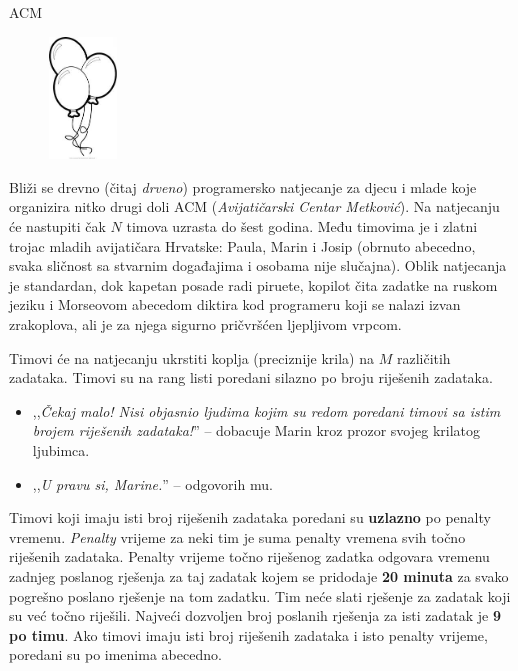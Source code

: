 \begin{statement}[
  problempoints=50,
  timelimit=1 sekunda,
  memorylimit=512 MiB,
]{ACM}

\setlength\intextsep{-0.1cm}
\begin{figure}
\centering
\includegraphics[width=0.16\textwidth]{img/balloon.jpeg}
\end{figure}

Bliži se drevno (čitaj \textit{drveno}) programersko natjecanje za djecu i
mlade koje organizira nitko drugi doli ACM (\textit{Avijatičarski Centar Metković}).
Na natjecanju će nastupiti čak $N$ timova uzrasta do šest godina. Među timovima
je i zlatni trojac mladih avijatičara Hrvatske: Paula, Marin i Josip (obrnuto
abecedno, svaka sličnost sa stvarnim događajima i osobama nije slučajna).
Oblik natjecanja je standardan, dok kapetan posade radi piruete, kopilot čita
zadatke na ruskom jeziku i Morseovom abecedom diktira kod programeru koji se
nalazi izvan zrakoplova, ali je za njega sigurno pričvršćen ljepljivom vrpcom.

Timovi će na natjecanju ukrstiti koplja (preciznije krila) na $M$ različitih
zadataka. Timovi su na rang listi poredani silazno po broju riješenih
zadataka.

\begin{itemize}[topsep=0pt]
\item ,,\textit{Čekaj malo! Nisi objasnio ljudima kojim su redom poredani
timovi sa istim brojem riješenih zadataka!}'' -- dobacuje Marin kroz prozor
svojeg krilatog ljubimca.
\item ,,\textit{U pravu si, Marine.}'' -- odgovorih mu.
\end{itemize}

Timovi koji imaju isti broj riješenih zadataka poredani su \textbf{uzlazno} po
penalty vremenu. \textit{Penalty} vrijeme za neki tim je suma penalty vremena
svih točno riješenih zadataka. Penalty vrijeme točno riješenog zadatka
odgovara vremenu zadnjeg poslanog rješenja za taj zadatak kojem se pridodaje
\textbf{20 minuta} za svako pogrešno poslano rješenje na tom zadatku.  Tim
neće slati rješenje za zadatak koji su već točno riješili. Najveći dozvoljen
broj poslanih rješenja za isti zadatak je \textbf{9 po timu}. Ako timovi
imaju isti broj riješenih zadataka i isto penalty vrijeme, poredani su po
imenima abecedno.


\end{statement}
